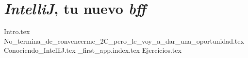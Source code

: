 \chapter{\textit{IntelliJ}, tu nuevo \textit{bff}}
  \label{ch:intellij}
  
  {Intro.tex}
  {No_termina_de_convencerme_2C_pero_le_voy_a_dar_una_oportunidad.tex}
  {Conociendo_IntelliJ.tex}
  {_first_app.index.tex}
  {Ejercicios.tex}
  \nocite{*}
  \printbibliography[keyword=intellij]